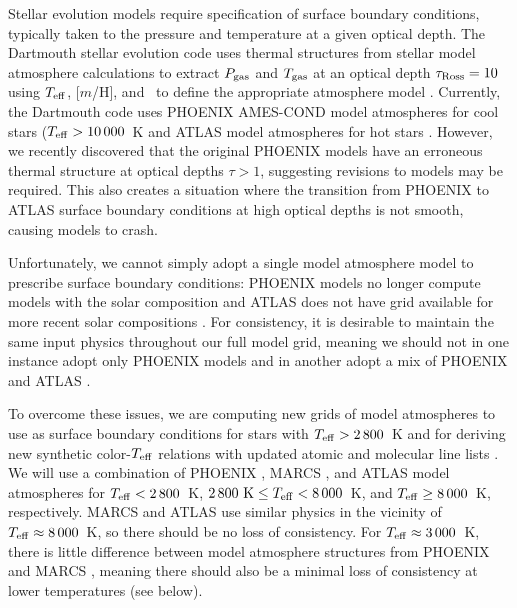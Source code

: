 Stellar evolution models require specification of surface boundary conditions, typically taken to the pressure and temperature at a given optical depth. The Dartmouth stellar evolution code uses thermal structures from stellar model atmosphere calculations to extract $P_{\rm gas}$ and $T_{\rm gas}$ at an optical depth $\tau_{\rm Ross} = 10$ using $T_{\rm eff}$, [$m$/H], and \logg\ to define the appropriate atmosphere model \citep{Feiden2016}. Currently, the Dartmouth code uses PHOENIX AMES-COND model atmospheres \citep{Hauschildt1999a} for cool stars ($T_{\rm eff} > 10\,000$~K and ATLAS model atmospheres for hot stars \citep{Castelli2004}. However, we recently discovered that the original PHOENIX models have an erroneous thermal structure at optical depths $\tau > 1$, suggesting revisions to models may be required. This also creates a situation where the transition from PHOENIX to ATLAS surface boundary conditions at high optical depths is not smooth, causing models to crash. 


Unfortunately, we cannot simply adopt a single model atmosphere model to prescribe surface boundary conditions: PHOENIX models no longer compute models with the \citet{GS98} solar composition and ATLAS does not have grid available for more recent solar compositions \citep[e.g.,][]{Asplund2009}. For consistency, it is desirable to maintain the same input physics throughout our full model grid, meaning we should not in one instance adopt only PHOENIX models \citep[for][]{Asplund2009} and in another adopt a mix of PHOENIX and ATLAS \citep[for][]{GS98}.

To overcome these issues, we are computing new grids of model atmospheres to use as surface boundary conditions for stars with $T_{\rm eff} > 2\,800$~K and for deriving new synthetic color-$T_{\rm eff}$ relations with updated atomic and molecular line lists \citep[e.g.,][]{Piskunov2016}. We will use a combination of PHOENIX \citep{Allard2011}, MARCS \citep{Gustafsson2008}, and ATLAS \citep{Castelli2004} model atmospheres for $T_{\rm eff} < 2\,800$~K, $2\,800 \textrm{ K} \le T_{\rm eff} < 8\,000$~K, and $T_{\rm eff} \ge 8\,000$~K, respectively. MARCS and ATLAS use similar physics in the vicinity of $T_{\rm eff} \approx 8\,000$~K, so there should be no loss of consistency. For $T_{\rm eff} \approx 3\,000$~K, there is little difference between model atmosphere structures from PHOENIX and MARCS \citep{Gustafsson2008}, meaning there should also be a minimal loss of consistency at lower temperatures (see below).

